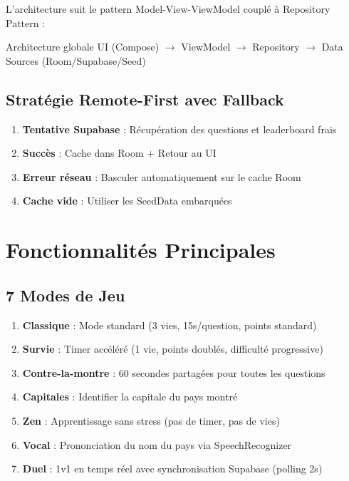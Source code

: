 \documentclass[12pt,a4paper,openany]{report}
\begin{document}
    L'architecture suit le pattern Model-View-ViewModel couplé à Repository Pattern :

    \begin{infobox}{Architecture globale}
    UI (Compose) $\rightarrow$ ViewModel $\rightarrow$ Repository $\rightarrow$ Data Sources (Room/Supabase/Seed)
    \end{infobox}

    \section{Stratégie Remote-First avec Fallback}

    \begin{enumerate}
      \item \textbf{Tentative Supabase} : Récupération des questions et leaderboard frais
      \item \textbf{Succès} : Cache dans Room + Retour au UI
      \item \textbf{Erreur réseau} : Basculer automatiquement sur le cache Room
      \item \textbf{Cache vide} : Utiliser les SeedData embarquées
    \end{enumerate}

    \chapter{Fonctionnalités Principales}

    \section{7 Modes de Jeu}

    \begin{enumerate}
      \item \textbf{Classique} : Mode standard (3 vies, 15s/question, points standard)
      \item \textbf{Survie} : Timer accéléré (1 vie, points doublés, difficulté progressive)
      \item \textbf{Contre-la-montre} : 60 secondes partagées pour toutes les questions
      \item \textbf{Capitales} : Identifier la capitale du pays montré
      \item \textbf{Zen} : Apprentissage sans stress (pas de timer, pas de vies)
      \item \textbf{Vocal} : Prononciation du nom du pays via SpeechRecognizer
      \item \textbf{Duel} : 1v1 en temps réel avec synchronisation Supabase (polling 2s)
    \end{enumerate}
\end{document}
